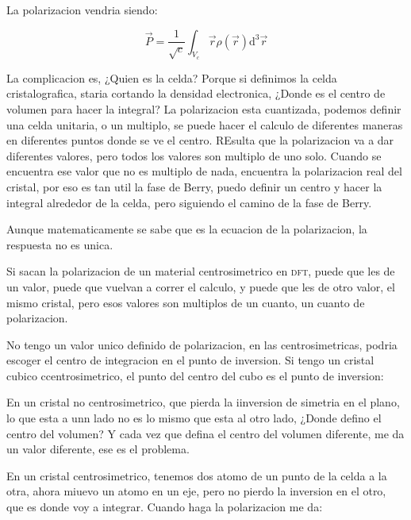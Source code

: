 \documentclass[11pt,fleqn]{book}
\begin{document}
La polarizacion vendria siendo:

\begin{equation}
    \vec{P}=\frac{1}{\sqrt{c}}\int_{V_{c}}\vec{r}\rho(\vec{r})\mathrm{d}^{3}\vec{r}
\end{equation}

La complicacion es, ¿Quien es la celda? Porque si definimos la celda cristalografica, staria cortando la densidad electronica, ¿Donde es el centro de volumen para hacer la integral? La polarizacion esta cuantizada, podemos definir una celda unitaria, o un multiplo, se puede hacer el calculo de diferentes maneras en diferentes puntos donde se ve el centro. REsulta que la polarizacion va a dar diferentes valores, pero todos los valores son multiplo de uno solo. Cuando se encuentra ese valor que no es multiplo de nada, encuentra la polarizacion real del cristal, por eso es tan util la fase de Berry, puedo definir un centro y hacer la integral alrededor de la celda, pero siguiendo el camino de la fase de Berry. 

Aunque matematicamente se sabe que es la ecuacion de la polarizacion, la respuesta no es unica. 

\begin{example}
Si sacan la polarizacion de un material centrosimetrico en \textsc{dft}, puede que les de un valor, puede que vuelvan a correr el calculo, y puede que les de otro valor, el mismo cristal, pero esos valores son multiplos de un cuanto, un cuanto de polarizacion.
\end{example}

No tengo un valor unico definido de polarizacion, en las centrosimetricas, podria escoger el centro de integracion en el punto de inversion. Si tengo un cristal cubico ccentrosimetrico, el punto del centro del cubo es el punto de inversion:


En un cristal no centrosimetrico, que pierda la iinversion de simetria en el plano, lo que esta a unn lado no es lo mismo que esta al otro lado, ¿Donde defino el centro del volumen? Y cada vez que defina el centro del volumen diferente, me da un valor diferente, ese es el problema. 

En un cristal centrosimetrico, tenemos dos atomo de un punto de la celda a la otra, ahora miuevo un atomo en un eje, pero no pierdo la inversion en el otro, que es donde voy a integrar. Cuando haga la polarizacion me da:

\end{document}
